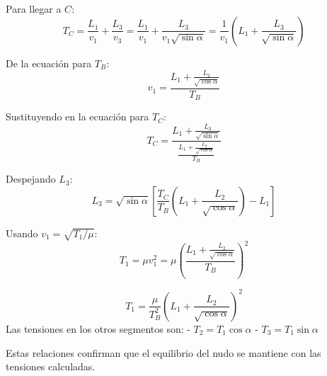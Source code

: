 \documentclass[
  11pt,
  letterpaper,
   addpoints,
  ]{exam}
\begin{document}
\begin{questions}
\begin{solution}
Para llegar a $C$:
\begin{equation}
T_C = \frac{L_1}{v_1} + \frac{L_3}{v_3} = \frac{L_1}{v_1} + \frac{L_3}{v_1\sqrt{\sin\alpha}} = \frac{1}{v_1}\left(L_1 + \frac{L_3}{\sqrt{\sin\alpha}}\right)
\end{equation}

De la ecuación para $T_B$:
\begin{equation}
v_1 = \frac{L_1 + \frac{L_2}{\sqrt{\cos\alpha}}}{T_B}
\end{equation}

Sustituyendo en la ecuación para $T_C$:
\begin{equation}
T_C = \frac{L_1 + \frac{L_3}{\sqrt{\sin\alpha}}}{\frac{L_1 + \frac{L_2}{\sqrt{\cos\alpha}}}{T_B}}
\end{equation}

Despejando $L_3$:
\begin{equation}
\boxed{L_3 = \sqrt{\sin\alpha}\left[\frac{T_C}{T_B}\left(L_1 + \frac{L_2}{\sqrt{\cos\alpha}}\right) - L_1\right]}
\end{equation}


Usando $v_1 = \sqrt{T_1/\mu}$:
\begin{equation}
T_1 = \mu v_1^2 = \mu \left(\frac{L_1 + \frac{L_2}{\sqrt{\cos\alpha}}}{T_B}\right)^2
\end{equation}

\begin{equation}
\boxed{T_1 = \frac{\mu}{T_B^2}\left(L_1 + \frac{L_2}{\sqrt{\cos\alpha}}\right)^2}
\end{equation}
Las tensiones en los otros segmentos son:
- $T_2 = T_1 \cos\alpha$
- $T_3 = T_1 \sin\alpha$

Estas relaciones confirman que el equilibrio del nudo se mantiene con las tensiones calculadas.
\end{solution}
\end{questions}
\end{document}
